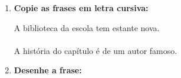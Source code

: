 \begin{exercicio}
\begin{enumerate}
  \item \textbf{Copie as frases em letra cursiva:}
  \begin{center}
  A biblioteca da escola tem estante nova.\\
  \underline{\hspace{12cm}}\\
  A história do capítulo é de um autor famoso.\\
  \underline{\hspace{12cm}}
  \end{center}

  \item \textbf{Desenhe a frase:}
  \begin{center}
  \end{center}

\end{enumerate}

\end{exercicio}



